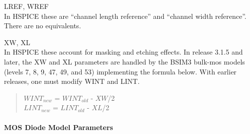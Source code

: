 \begin{description}
\item{{\vt LREF}, {\vt WREF}}\\
 In HSPICE these are ``channel length reference'' and ``channel width
 reference''.  There are no {\WRspice} equivalents.
\item{{\vt XW}, {\vt XL}}\\
 In HSPICE these account for masking and etching effects.  In release
 3.1.5 and later, the {\vt XW} and {\vt XL} parameters are handled by
 the BSIM3 bulk-mos models (levels 7, 8, 9, 47, 49, and 53)
 implementing the formula below.  With earlier releases, one must
 modify {\vt WINT} and {\vt LINT}.
\begin{quote}
  $WINT_{new}$ = $WINT_{old}$ - $XW$/2\\
  $LINT_{new}$ = $LINT_{old}$ - $XL$/2
\end{quote}
\end{description}

\paragraph{MOS Diode Model Parameters}

